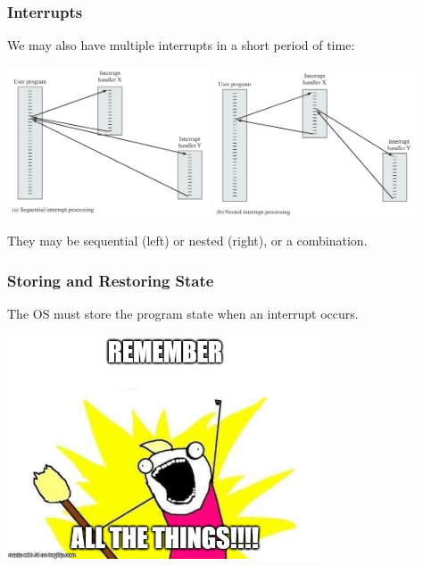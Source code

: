 \begin{frame}
\frametitle{Interrupts}

We may also have multiple interrupts in a short period of time:

\begin{center}
\includegraphics[width=0.45\textwidth]{images/interrupts-seq.png}
\includegraphics[width=0.45\textwidth]{images/interrupts-nest.png}
\end{center}

They may be sequential (left) or nested (right), or a combination.

\end{frame}

\begin{frame}
\frametitle{Storing and Restoring State}

The OS must store the program state when an interrupt occurs.

\begin{center}
	\includegraphics[width=0.7\textwidth]{images/rememberthings.jpg}
\end{center}

\end{frame}

